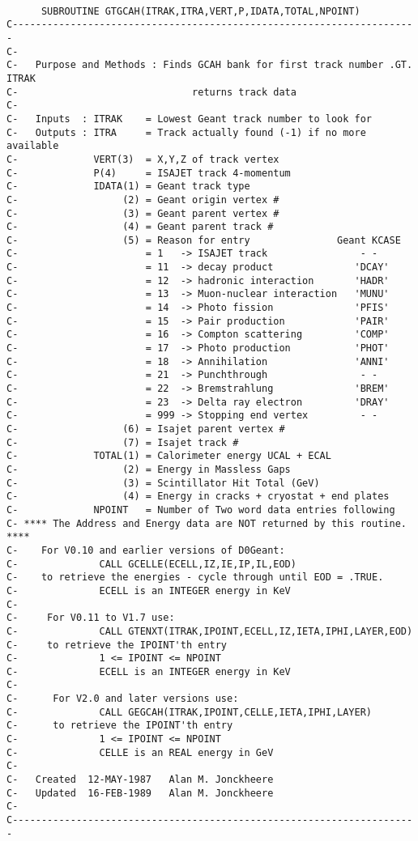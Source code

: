 \begin{verbatim}

      SUBROUTINE GTGCAH(ITRAK,ITRA,VERT,P,IDATA,TOTAL,NPOINT)
C----------------------------------------------------------------------
C-
C-   Purpose and Methods : Finds GCAH bank for first track number .GT. ITRAK
C-                              returns track data
C-
C-   Inputs  : ITRAK    = Lowest Geant track number to look for
C-   Outputs : ITRA     = Track actually found (-1) if no more available
C-             VERT(3)  = X,Y,Z of track vertex
C-             P(4)     = ISAJET track 4-momentum
C-             IDATA(1) = Geant track type
C-                  (2) = Geant origin vertex #
C-                  (3) = Geant parent vertex #
C-                  (4) = Geant parent track #
C-                  (5) = Reason for entry               Geant KCASE
C-                      = 1   -> ISAJET track                - -
C-                      = 11  -> decay product              'DCAY'
C-                      = 12  -> hadronic interaction       'HADR'
C-                      = 13  -> Muon-nuclear interaction   'MUNU'
C-                      = 14  -> Photo fission              'PFIS'
C-                      = 15  -> Pair production            'PAIR'
C-                      = 16  -> Compton scattering         'COMP'
C-                      = 17  -> Photo production           'PHOT'
C-                      = 18  -> Annihilation               'ANNI'
C-                      = 21  -> Punchthrough                - -
C-                      = 22  -> Bremstrahlung              'BREM'
C-                      = 23  -> Delta ray electron         'DRAY'
C-                      = 999 -> Stopping end vertex         - -
C-                  (6) = Isajet parent vertex #
C-                  (7) = Isajet track #
C-             TOTAL(1) = Calorimeter energy UCAL + ECAL
C-                  (2) = Energy in Massless Gaps
C-                  (3) = Scintillator Hit Total (GeV)
C-                  (4) = Energy in cracks + cryostat + end plates
C-             NPOINT   = Number of Two word data entries following
C- **** The Address and Energy data are NOT returned by this routine. ****
C-    For V0.10 and earlier versions of D0Geant:
C-              CALL GCELLE(ECELL,IZ,IE,IP,IL,EOD)
C-    to retrieve the energies - cycle through until EOD = .TRUE.
C-              ECELL is an INTEGER energy in KeV
C-
C-     For V0.11 to V1.7 use:
C-              CALL GTENXT(ITRAK,IPOINT,ECELL,IZ,IETA,IPHI,LAYER,EOD)
C-     to retrieve the IPOINT'th entry
C-              1 <= IPOINT <= NPOINT
C-              ECELL is an INTEGER energy in KeV
C-
C-      For V2.0 and later versions use:
C-              CALL GEGCAH(ITRAK,IPOINT,CELLE,IETA,IPHI,LAYER)
C-      to retrieve the IPOINT'th entry
C-              1 <= IPOINT <= NPOINT
C-              CELLE is an REAL energy in GeV
C-
C-   Created  12-MAY-1987   Alan M. Jonckheere
C-   Updated  16-FEB-1989   Alan M. Jonckheere
C-
C----------------------------------------------------------------------




\end{verbatim}
